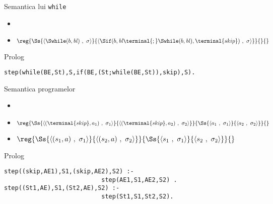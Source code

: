 \documentclass[xcolor=x11names,compress,10pt]{beamer}
\newcommand{\Conf}[2]{\ensuremath{\langle #1\ ,\ #2\rangle}}
\renewcommand{\to}{}
\begin{document}
 \begin{frame}[fragile]{Semantica lui \texttt{while}}
\vspace*{0.5cm}
 
 
    \begin{itemize}
  \item {} 
  \item[]
  $\reg{
   \Ss{\Conf{\Swhile ({b},{\it bl})}{\sigma}}\to{\Conf{\Sif({b},  {\it bl}\terminal{;}\Swhile({b},{\it bl}),\terminal{skip})}{\sigma}}
  }{}
  {}$
  
\end{itemize}
 
  \begin{block}{Prolog}  
  \begin{verbatim}
step(while(BE,St),S,if(BE,(St;while(BE,St)),skip),S).
  \end{verbatim}
  \end{block}
  \end{frame}  
   
   
 \begin{frame}[fragile]{Semantica programelor}
\vspace*{0.5cm}
 
 
    \begin{itemize}
  \item {} 
  \item[] $\reg{\Ss{\Conf{(\terminal{skip}, a_1)}{\sigma_1}}\to{\Conf{(\terminal{skip}, a_2)}{\sigma_2}}}{\Ss{\Conf{a_1}{\sigma_1}}\to{\Conf{a_2}{\sigma_2}}}{}$

 \item[] $\reg{\Ss{\Conf{(s_1, a)}{\sigma_1}}\to{\Conf{(s_2, a)}{\sigma_2}}}{\Ss{\Conf{s_1}{\sigma_1}}\to{\Conf{s_2}{\sigma_2}}}{}$  

  
  
\end{itemize}
 
  \begin{block}{Prolog}  
  \begin{verbatim}
step((skip,AE1),S1,(skip,AE2),S2) :- 
                           step(AE1,S1,AE2,S2) .
step((St1,AE),S1,(St2,AE),S2) :-
                           step(St1,S1,St2,S2).
  \end{verbatim}
  \end{block}
  \end{frame} 
  
\end{document}
